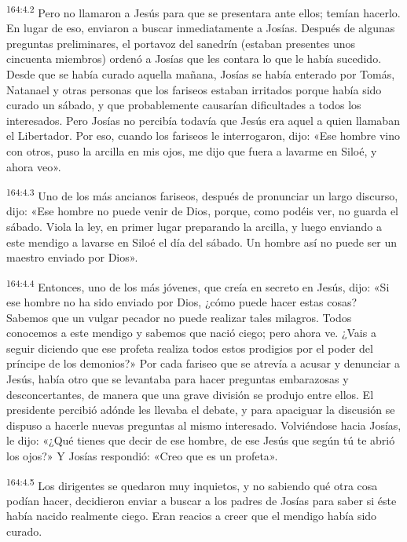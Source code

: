 \par 
\textsuperscript{164:4.2} Pero no llamaron a Jesús para que se presentara ante ellos; temían hacerlo. En lugar de eso, enviaron a buscar inmediatamente a Josías. Después de algunas preguntas preliminares, el portavoz del sanedrín (estaban presentes unos cincuenta miembros) ordenó a Josías que les contara lo que le había sucedido. Desde que se había curado aquella mañana, Josías se había enterado por Tomás, Natanael y otras personas que los fariseos estaban irritados porque había sido curado un sábado, y que probablemente causarían dificultades a todos los interesados. Pero Josías no percibía todavía que Jesús era aquel a quien llamaban el Libertador. Por eso, cuando los fariseos le interrogaron, dijo: «Ese hombre vino con otros, puso la arcilla en mis ojos, me dijo que fuera a lavarme en Siloé, y ahora veo».

\par 
\textsuperscript{164:4.3} Uno de los más ancianos fariseos, después de pronunciar un largo discurso, dijo: «Ese hombre no puede venir de Dios, porque, como podéis ver, no guarda el sábado. Viola la ley, en primer lugar preparando la arcilla, y luego enviando a este mendigo a lavarse en Siloé el día del sábado. Un hombre así no puede ser un maestro enviado por Dios».

\par 
\textsuperscript{164:4.4} Entonces, uno de los más jóvenes, que creía en secreto en Jesús, dijo: «Si ese hombre no ha sido enviado por Dios, ¿cómo puede hacer estas cosas? Sabemos que un vulgar pecador no puede realizar tales milagros. Todos conocemos a este mendigo y sabemos que nació ciego; pero ahora ve. ¿Vais a seguir diciendo que ese profeta realiza todos estos prodigios por el poder del príncipe de los demonios?» Por cada fariseo que se atrevía a acusar y denunciar a Jesús, había otro que se levantaba para hacer preguntas embarazosas y desconcertantes, de manera que una grave división se produjo entre ellos. El presidente percibió adónde les llevaba el debate, y para apaciguar la discusión se dispuso a hacerle nuevas preguntas al mismo interesado. Volviéndose hacia Josías, le dijo: «¿Qué tienes que decir de ese hombre, de ese Jesús que según tú te abrió los ojos?» Y Josías respondió: «Creo que es un profeta».

\par 
\textsuperscript{164:4.5} Los dirigentes se quedaron muy inquietos, y no sabiendo qué otra cosa podían hacer, decidieron enviar a buscar a los padres de Josías para saber si éste había nacido realmente ciego. Eran reacios a creer que el mendigo había sido curado.

